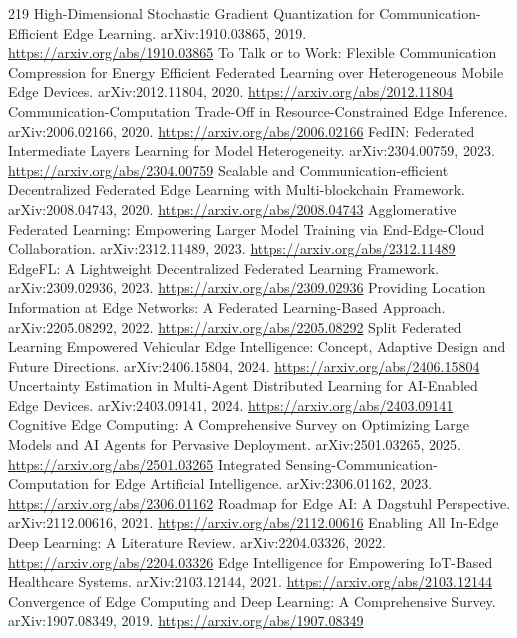 \documentclass[11pt]{article}
\begin{document}
\begin{thebibliography}{219}
 High-Dimensional Stochastic Gradient Quantization for Communication-Efficient Edge Learning. arXiv:1910.03865, 2019. \url{https://arxiv.org/abs/1910.03865}
 To Talk or to Work: Flexible Communication Compression for Energy Efficient Federated Learning over Heterogeneous Mobile Edge Devices. arXiv:2012.11804, 2020. \url{https://arxiv.org/abs/2012.11804}
 Communication-Computation Trade-Off in Resource-Constrained Edge Inference. arXiv:2006.02166, 2020. \url{https://arxiv.org/abs/2006.02166}
 FedIN: Federated Intermediate Layers Learning for Model Heterogeneity. arXiv:2304.00759, 2023. \url{https://arxiv.org/abs/2304.00759}
 Scalable and Communication-efficient Decentralized Federated Edge Learning with Multi-blockchain Framework. arXiv:2008.04743, 2020. \url{https://arxiv.org/abs/2008.04743}
 Agglomerative Federated Learning: Empowering Larger Model Training via End-Edge-Cloud Collaboration. arXiv:2312.11489, 2023. \url{https://arxiv.org/abs/2312.11489}
 EdgeFL: A Lightweight Decentralized Federated Learning Framework. arXiv:2309.02936, 2023. \url{https://arxiv.org/abs/2309.02936}
 Providing Location Information at Edge Networks: A Federated Learning-Based Approach. arXiv:2205.08292, 2022. \url{https://arxiv.org/abs/2205.08292}
 Split Federated Learning Empowered Vehicular Edge Intelligence: Concept, Adaptive Design and Future Directions. arXiv:2406.15804, 2024. \url{https://arxiv.org/abs/2406.15804}
 Uncertainty Estimation in Multi-Agent Distributed Learning for AI-Enabled Edge Devices. arXiv:2403.09141, 2024. \url{https://arxiv.org/abs/2403.09141}
 Cognitive Edge Computing: A Comprehensive Survey on Optimizing Large Models and AI Agents for Pervasive Deployment. arXiv:2501.03265, 2025. \url{https://arxiv.org/abs/2501.03265}
 Integrated Sensing-Communication-Computation for Edge Artificial Intelligence. arXiv:2306.01162, 2023. \url{https://arxiv.org/abs/2306.01162}
 Roadmap for Edge AI: A Dagstuhl Perspective. arXiv:2112.00616, 2021. \url{https://arxiv.org/abs/2112.00616}
 Enabling All In-Edge Deep Learning: A Literature Review. arXiv:2204.03326, 2022. \url{https://arxiv.org/abs/2204.03326}
 Edge Intelligence for Empowering IoT-Based Healthcare Systems. arXiv:2103.12144, 2021. \url{https://arxiv.org/abs/2103.12144}
 Convergence of Edge Computing and Deep Learning: A Comprehensive Survey. arXiv:1907.08349, 2019. \url{https://arxiv.org/abs/1907.08349}

\end{thebibliography}
\end{document}
